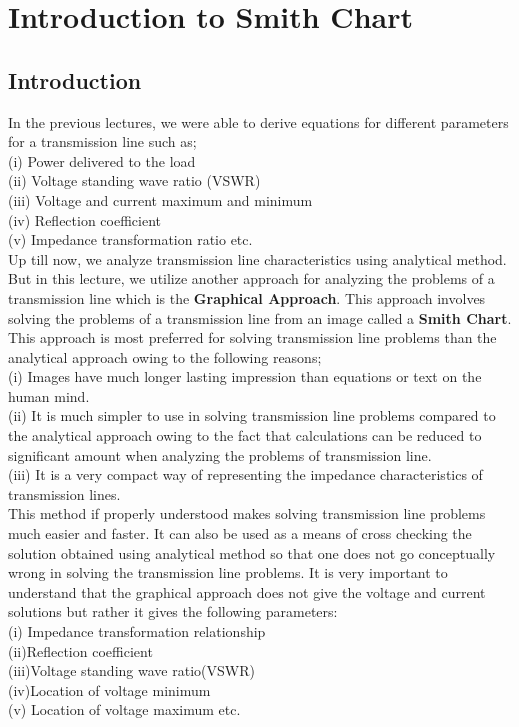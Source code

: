 \chapter{\textbf{Introduction to Smith Chart}}
\section{Introduction}
In the previous lectures, we were able to derive equations for different parameters for a transmission line such as;\\
(i)	Power delivered to the load\\
(ii)	Voltage standing wave ratio (VSWR)\\
(iii)	Voltage and current maximum and minimum\\
(iv)	Reflection coefficient\\
(v)	Impedance transformation ratio etc.\\

Up till now, we analyze transmission line characteristics using analytical method. But in this lecture, we utilize another approach for analyzing the problems of a transmission line which is the \textbf{Graphical Approach}.
This approach involves solving the problems of a transmission line from an image called a \textbf{Smith Chart}.
This approach is most preferred for solving transmission line problems than the analytical approach owing to the following reasons;\\

(i)	Images have much longer lasting impression than equations or text on the human mind.\\

(ii)	It is much simpler to use in solving transmission line problems compared to the analytical approach owing to the fact that calculations can be reduced to significant amount when analyzing the problems of transmission line.\\

(iii)	It is a very compact way of representing the impedance characteristics of transmission lines.\\

This method if properly understood makes solving transmission line problems much easier and faster.  It can also be used as a means of cross checking the solution obtained using analytical method so that one does not go conceptually wrong in solving the transmission line problems.
It is very important to understand that the graphical approach does not give the voltage and current solutions but rather it gives the following parameters:\\
(i)	Impedance transformation relationship\\ 
(ii)Reflection coefficient\\
(iii)Voltage standing wave ratio(VSWR)\\
(iv)Location of voltage minimum\\
(v)	Location of voltage maximum etc.\\

